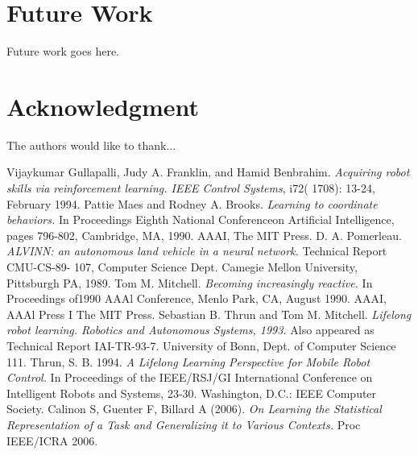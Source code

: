\documentclass[conference]{IEEEtran}
\begin{document}
\section{Future Work}
Future work goes here.

\section*{Acknowledgment}


The authors would like to thank...

\begin{thebibliography}{1}

Vijaykumar Gullapalli,  Judy A. Franklin, and Hamid Benbrahim.  \emph{Acquiring robot skills via reinforcement  learning. IEEE Control Systems}, i72(  1708):  13-24, February  1994. 
Pattie Maes and Rodney A. Brooks.  \emph{Learning to coordinate behaviors.} In Proceedings Eighth National Conferenceon Artificial Intelligence,  pages 796-802, Cambridge, MA, 1990.  AAAI, The MIT Press. 
D.  A. Pomerleau.  \emph{ALVINN: an  autonomous land vehicle  in  a neural network.}  Technical Report CMU-CS-89- 107, Computer Science Dept. Camegie Mellon University, Pittsburgh PA, 1989.
Tom M. Mitchell.  \emph{Becoming  increasingly reactive.}  In Proceedings of1990 AAAl Conference, Menlo Park, CA, August  1990.  AAAI, AAAl Press I The MIT Press. 
Sebastian B. Thrun and Tom M. Mitchell.  \emph{Lifelong robot learning. Robotics and Autonomous Systems, 1993.} Also appeared as Technical Report IAI-TR-93-7.  University of Bonn, Dept.  of Computer Science 111.
Thrun, S. B. 1994. \emph{A Lifelong Learning Perspective for Mobile Robot Control.} In Proceedings of the IEEE/RSJ/GI International Conference on Intelligent Robots and Systems, 23-30. Washington, D.C.: IEEE Computer Society.
Calinon S, Guenter F, Billard A (2006). \emph{On Learning the Statistical Representation of a Task and Generalizing it to Various Contexts.}  Proc IEEE/ICRA 2006.

\end{thebibliography}

\end{document}
